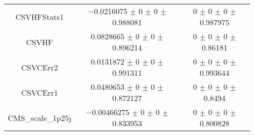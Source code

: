 \begin{table}
\begin{tabular}{ccc}
CSVHFStats1 	& \num{-0.0216075} $\pm$ \num{0} $\pm$ \num{0} $\pm$ \num{0.988081} 	& \num{0} $\pm$ \num{0} $\pm$ \num{0} $\pm$ \num{0.987975}\\
CSVHF 	& \num{0.0828665} $\pm$ \num{0} $\pm$ \num{0} $\pm$ \num{0.896214} 	& \num{0} $\pm$ \num{0} $\pm$ \num{0} $\pm$ \num{0.86181}\\
CSVCErr2 	& \num{0.0131872} $\pm$ \num{0} $\pm$ \num{0} $\pm$ \num{0.991311} 	& \num{0} $\pm$ \num{0} $\pm$ \num{0} $\pm$ \num{0.993644}\\
CSVCErr1 	& \num{0.0480653} $\pm$ \num{0} $\pm$ \num{0} $\pm$ \num{0.872127} 	& \num{0} $\pm$ \num{0} $\pm$ \num{0} $\pm$ \num{0.8494}\\
CMS\_scale\_1p25j 	& \num{-0.00466275} $\pm$ \num{0} $\pm$ \num{0} $\pm$ \num{0.833953} 	& \num{0} $\pm$ \num{0} $\pm$ \num{0} $\pm$ \num{0.800828}\\
\bottomrule
\end{tabular}
\end{table}